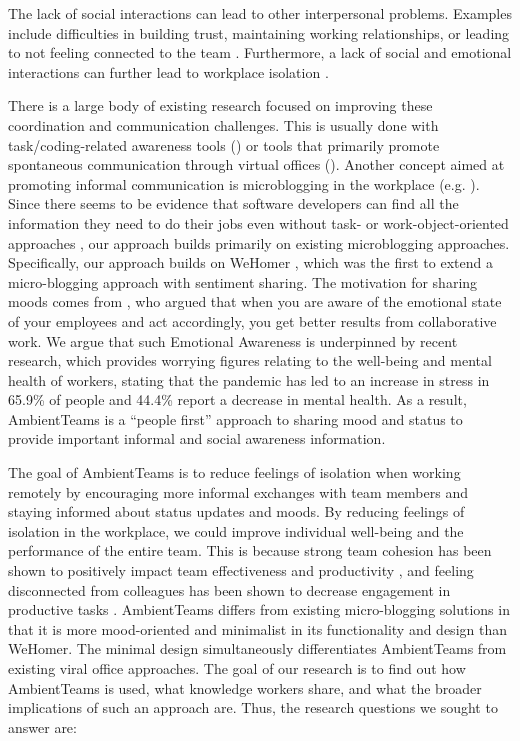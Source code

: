 The lack of social interactions can lead to other interpersonal problems. Examples include difficulties in building trust, maintaining working relationships, or leading to not feeling connected to the team \autocite{comella2020revisiting, olson2006bridging}. Furthermore, a lack of social and emotional interactions can further lead to workplace isolation \autocite{marshall2007workplace, gorlick2020productivity, mulki2009set}.

There is a large body of existing research focused on improving these coordination and communication challenges. This is usually done with task/coding-related awareness tools (\autocite{biehl2007fastdash, jakobsen2009wipdash}) or tools that primarily promote spontaneous communication through virtual offices (\autocite{sasaki1999video, lou2012presencescape}). Another concept aimed at promoting informal communication is microblogging in the workplace (e.g. \autocite{ebner2008microblogging, ehrlich2010microblogging, zhang2010case,dullemond2013fixing}). Since there seems to be evidence that software developers can find all the information they need to do their jobs even without task- or work-object-oriented approaches \autocite{gutwin2004group}, our approach builds primarily on existing microblogging approaches. Specifically, our approach builds on WeHomer \autocite{dullemond2013fixing}, which was the first to extend a micro-blogging approach with sentiment sharing. The motivation for sharing moods comes from \textcite{garcia1999emotional}, who argued that when you are aware of the emotional state of your employees and act accordingly, you get better results from collaborative work. We argue that such Emotional Awareness is underpinned by recent research, which provides worrying figures relating to the well-being and mental health of workers, stating that the pandemic has led to an increase in stress in 65.9\% of people and 44.4\% report a decrease in mental health. As a result, AmbientTeams is a \enquote{people first} approach to sharing mood and status to provide important informal and social awareness information.

The goal of AmbientTeams is to reduce feelings of isolation when working remotely by encouraging more informal exchanges with team members and staying informed about status updates and moods. By reducing feelings of isolation in the workplace, we could improve individual well-being and the performance of the entire team. This is because strong team cohesion has been shown to positively impact team effectiveness and productivity \autocite{carlson2017virtual}, and feeling disconnected from colleagues has been shown to decrease engagement in productive tasks \autocite{lostFocus2020}. AmbientTeams differs from existing micro-blogging solutions in that it is more mood-oriented and minimalist in its functionality and design than WeHomer. The minimal design simultaneously differentiates AmbientTeams from existing viral office approaches. The goal of our research is to find out how AmbientTeams is used, what knowledge workers share, and what the broader implications of such an approach are. Thus, the research questions we sought to answer are:

